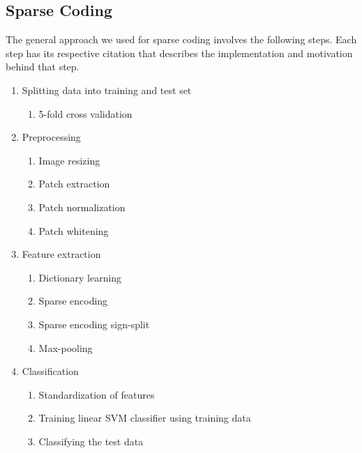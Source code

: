 \documentclass[	DIV=calc,%
				paper=a4,%
				fontsize=11pt,%
				twocolumn]{scrartcl}	 %
\begin{document}
\subsection*{Sparse Coding}
The general approach we used for sparse coding involves the following steps. Each step has its respective citation that describes the implementation and motivation behind that step.
\begin{enumerate}
\item Splitting data into training and test set
	\begin{enumerate}
	\item 5-fold cross validation \cite{sklearn_cross_validation}
	\end{enumerate}
\item Preprocessing
	\begin{enumerate}
	\item Image resizing \cite{coates2011analysis}
	\item Patch extraction \cite{coates2011analysis}
	\item Patch normalization \cite{coates2011analysis}
	\item Patch whitening \cite{coates2011analysis}
	\end{enumerate}
\item Feature extraction
	\begin{enumerate}
	\item Dictionary learning \cite{mairal2009online, spams}
	\item Sparse encoding \cite{mairal2009online, spams}
	\item Sparse encoding sign-split 
	\item Max-pooling  \cite{yang2009linear, scherer2010evaluation}
	\end{enumerate}
\item Classification
	\begin{enumerate}
	\item Standardization of features \cite{wiki_feature_scaling}
	\item Training linear SVM classifier using training data \cite{svm_light}
	\item Classifying the test data \cite{svm_light}
	\end{enumerate}
\end{enumerate}
\end{document}
